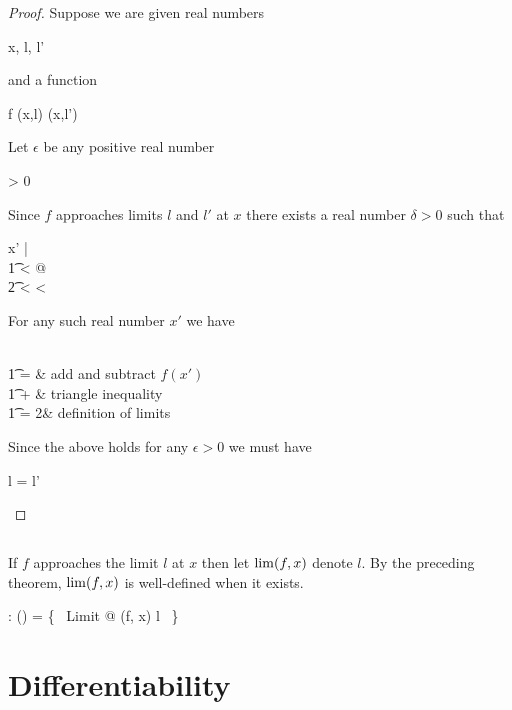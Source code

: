 \documentclass[11pt, oneside]{article}
\begin{document}
\begin{proof}
Suppose we are given real numbers
\begin{argue}
	x, l, l' \in \R 
\end{argue}
and a function
\begin{argue}
	f \in \limRR(x,l) \cap \limRR(x,l')
\end{argue}
Let $\epsilon$ be any positive real number
\begin{argue}
	\epsilon > 0
\end{argue}
Since $f$ approaches limits $l$ and $l'$ at $x$ there exists a real number $\delta > 0$ such that
\begin{argue}
	\forall x' \in \R |  \\
	\t1	\zeroR \ltR {}< \delta @ \\
	\t2		  < \epsilon \land {} < \epsilon
\end{argue}
For any such real number $x'$ we have
\begin{argue}
	 \\
	\t1	=  			& add and subtract $f(x')$ \\
	\t1	\leq {} +  	& triangle inequality \\
	\t1	= 2\epsilon					& definition of limits
\end{argue}
Since the above holds for any $\epsilon > 0$ we must have
\begin{argue}
	l = l'
\end{argue}

\end{proof}

\subsection{}

If $f$ approaches the limit $l$ at $x$ then let $\operatorname{lim}(f,x)$ denote $l$.
By the preceding theorem, $\operatorname{lim}(f,x)$ is well-defined when it exists.

\begin{axdef}
	\limFR: (\R \pfun \R) \cross \R \pfun \R
\where
	\limFR = \{~ Limit @ (f, x) \mapsto l ~\}
\end{axdef}

\section{Differentiability}
\end{document}

